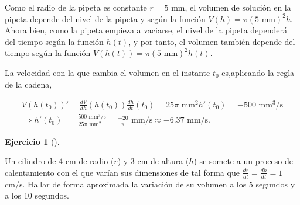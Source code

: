 \documentclass[
  spanish,
  a4paper,
]{scrreport}
\theoremstyle{definition}
\newtheorem{exercise}{Ejercicio}[chapter]
\theoremstyle{remark}
\begin{document}
\begin{tcolorbox}[enhanced jigsaw, arc=.35mm, bottomrule=.15mm, bottomtitle=1mm, breakable, colback=white, colbacktitle=quarto-callout-tip-color!10!white, colframe=quarto-callout-tip-color-frame, coltitle=black, left=2mm, leftrule=.75mm, opacityback=0, opacitybacktitle=0.6, rightrule=.15mm, title=\textcolor{quarto-callout-tip-color}{\faLightbulb}\hspace{0.5em}{Solución}, titlerule=0mm, toprule=.15mm, toptitle=1mm]

Como el radio de la pipeta es constante \(r=5\) mm, el volumen de
solución en la pipeta depende del nivel de la pipeta y según la función
\(V(h) = \pi (5 \mbox{ mm})^2 h\). Ahora bien, como la pipeta empieza a
vaciarse, el nivel de la pipeta dependerá del tiempo según la función
\(h(t)\), y por tanto, el volumen también depende del tiempo según la
función \(V(h(t)) = \pi (5 \mbox{ mm})^2 h(t)\).

La velocidad con la que cambia el volumen en el instante \(t_0\)
es,aplicando la regla de la cadena,

\[
\begin{gathered}
V(h(t_0))' = \frac{dV}{dh}(h(t_0))\frac{dh}{dt}(t_0) = 25\pi \mbox{ mm}^2 h'(t_0) = -500 \mbox{ mm$^3$/s}\\ \Rightarrow h'(t_0) = \frac{-500 \mbox{ mm$^3$/s}}{25\pi \mbox{ mm}^2} = \frac{-20}{\pi} \mbox{ mm/s}  \approx -6.37 \mbox{ mm/s}.
\end{gathered}
\]

\end{tcolorbox}

\begin{exercise}[]\protect\hypertarget{exr-regla-cadena-4}{}\label{exr-regla-cadena-4}

Un cilindro de 4 cm de radio (\(r\)) y 3 cm de altura (\(h\)) se somete
a un proceso de calentamiento con el que varían sus dimensiones de tal
forma que \(\frac{dr}{dt}=\frac{dh}{dt}= 1\) cm/s. Hallar de forma
aproximada la variación de su volumen a los 5 segundos y a los 10
segundos.

\end{exercise}
\end{document}
